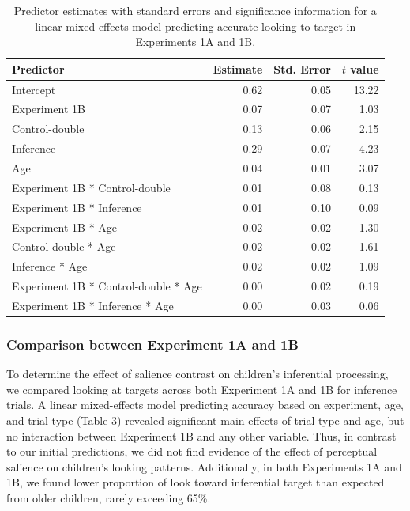 \documentclass[a4paper,man,apacite,floatsintext]{apa6}
\begin{document}
\begin{table}[tb]
\centering
\begin{tabular}{lrrr}
 Predictor & Estimate & Std. Error & $t$ value \\ 
  \hline
Intercept & 0.62 & 0.05 & 13.22 \\ 
  Experiment 1B & 0.07 & 0.07 & 1.03 \\ 
  Control-double & 0.13 & 0.06 & 2.15 \\ 
  Inference & -0.29 & 0.07 & -4.23 \\ 
  Age & 0.04 & 0.01 & 3.07 \\ 
  Experiment 1B * Control-double & 0.01 & 0.08 & 0.13 \\ 
  Experiment 1B * Inference & 0.01 & 0.10 & 0.09 \\ 
  Experiment 1B * Age & -0.02 & 0.02 & -1.30 \\ 
  Control-double * Age & -0.02 & 0.02 & -1.61 \\ 
  Inference * Age & 0.02 & 0.02 & 1.09 \\ 
  Experiment 1B * Control-double * Age & 0.00 & 0.02 & 0.19 \\ 
  Experiment 1B * Inference * Age & 0.00 & 0.03 & 0.06 \\ 
   \hline
\end{tabular}
\caption{Predictor estimates with standard errors and significance information for a linear mixed-effects model predicting accurate looking to target in Experiments 1A and 1B.} 
\label{tab:exp2_tab}
\end{table}

\subsubsection{Comparison between Experiment 1A and
1B}\label{comparison-between-experiment-1a-and-1b}

To determine the effect of salience contrast on children's inferential
processing, we compared looking at targets across both Experiment 1A and
1B for inference trials. A linear mixed-effects model predicting
accuracy based on experiment, age, and trial type (Table 3) revealed
significant main effects of trial type and age, but no interaction
between Experiment 1B and any other variable. Thus, in contrast to our
initial predictions, we did not find evidence of the effect of
perceptual salience on children's looking patterns. Additionally, in
both Experiments 1A and 1B, we found lower proportion of look toward
inferential target than expected from older children, rarely exceeding
65\%.
\end{document}

